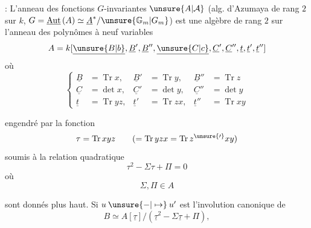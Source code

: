  : L'anneau  des fonctions $G$-invariantes   $\unsure{A|\mathcal A}$ (alg. d'Azumaya de rang $2$ sur $k$\unsure{)|\}}, $G=\underline{\mathrm{Aut}}\,(A)\simeq\underline{A}^{*}/\unsure{\mathbb G_m|G_m}$) est une algèbre   de rang $2$ sur l'anneau des polynômes à neuf variables
\[
 A=k[\underline{\unsure{B|b}},\underline B',\underline B'',\underline{\unsure{C|c}},\underline C',\underline C'',\underline{t},\underline t',\underline t'']
\]
où
\[
 \left\{\begin{aligned}
 \underline B&=\operatorname{Tr}x,& \underline B'&=\operatorname{Tr}y,& \underline B''&=\operatorname{Tr}z\\
 \underline C&=\det x,& \underline C'&=\det y,& \underline C''&=\det y\\
 \underline t&=\operatorname{Tr}yz,& \underline t'&=\operatorname{Tr}zx,& \underline t''&=\operatorname{Tr}xy
 \end{aligned}\right.
\]

engendré par la fonction
\[
 \tau=\operatorname{Tr}xyz\qquad(=\operatorname{Tr}yzx=\operatorname{Tr}z^{\unsure{\prime}}xy)
\]
soumis à la relation quadratique
\[
 \boxed{\tau^2-\Sigma\tau+\Pi=0}
\]
où 
\[
 \Sigma,\Pi\in A
\]

sont donnés plus haut. Si $u\mathbin{\unsure{-|\mapsto}}u'$ est l'involution canonique de
\[
 B\simeq A[\underline\tau]/(\underline\tau^2-\Sigma\underline\tau+\Pi),
\]
